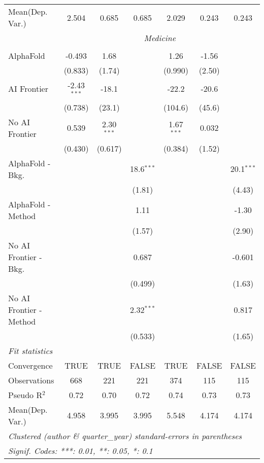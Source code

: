 \begin{tabular}{lcccccc}
Mean(Dep. Var.) & 2.504 & 0.685 & 0.685 & 2.029 & 0.243 & 0.243 \\
 & \multicolumn{6}{c}{\textit{Medicine}} \\ \\
   AlphaFold               & -0.493        & 1.68         &              & 1.26         & -1.56  &   \\   
                           & (0.833)       & (1.74)       &              & (0.990)      & (2.50) &   \\   
   AI Frontier             & -2.43$^{***}$ & -18.1        &              & -22.2        & -20.6  &   \\   
                           & (0.738)       & (23.1)       &              & (104.6)      & (45.6) &   \\   
   No AI Frontier          & 0.539         & 2.30$^{***}$ &              & 1.67$^{***}$ & 0.032  &   \\   
                           & (0.430)       & (0.617)      &              & (0.384)      & (1.52) &   \\   
   AlphaFold - Bkg.        &               &              & 18.6$^{***}$ &              &        & 20.1$^{***}$\\   
                           &               &              & (1.81)       &              &        & (4.43)\\   
   AlphaFold - Method      &               &              & 1.11         &              &        & -1.30\\   
                           &               &              & (1.57)       &              &        & (2.90)\\   
   No AI Frontier - Bkg.   &               &              & 0.687        &              &        & -0.601\\   
                           &               &              & (0.499)      &              &        & (1.63)\\   
   No AI Frontier - Method &               &              & 2.32$^{***}$ &              &        & 0.817\\   
                           &               &              & (0.533)      &              &        & (1.65)\\   
   \midrule
   \emph{Fit statistics}\\
   Convergence             &TRUE           & TRUE         & FALSE        & TRUE         & FALSE  & FALSE\\  
   Observations            & 668           & 221          & 221          & 374          & 115    & 115\\  
   Pseudo R$^2$            & 0.72          & 0.70         & 0.72         & 0.74         & 0.73   & 0.73\\  
Mean(Dep. Var.) & 4.958 & 3.995 & 3.995 & 5.548 & 4.174 & 4.174 \\
   \midrule \midrule
   \multicolumn{7}{l}{\emph{Clustered (author \& quarter\_year) standard-errors in parentheses}}\\
   \multicolumn{7}{l}{\emph{Signif. Codes: ***: 0.01, **: 0.05, *: 0.1}}\\
\end{tabular}
\par\endgroup
